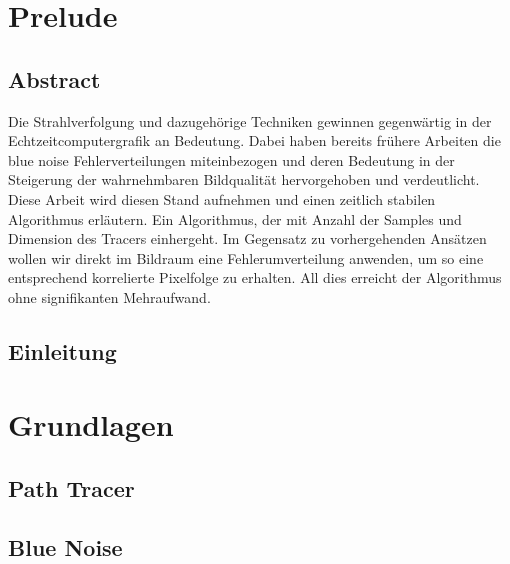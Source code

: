 
\chapter{Prelude}
\label{ch:Introduction}

\section{Abstract}

\vspace*{\fill}
Die Strahlverfolgung und dazugehörige Techniken gewinnen gegenwärtig in der Echtzeitcomputergrafik an Bedeutung. Dabei haben bereits frühere Arbeiten
die blue noise Fehlerverteilungen miteinbezogen und deren Bedeutung in der Steigerung der wahrnehmbaren Bildqualität hervorgehoben und verdeutlicht.
Diese Arbeit wird diesen Stand aufnehmen und einen zeitlich stabilen Algorithmus erläutern. Ein Algorithmus, der mit Anzahl der Samples und Dimension
des Tracers einhergeht. Im Gegensatz zu vorhergehenden Ansätzen wollen wir direkt im Bildraum eine Fehlerumverteilung anwenden, um so eine entsprechend 
korrelierte Pixelfolge zu erhalten. All dies erreicht der Algorithmus ohne signifikanten Mehraufwand.
\vfill

\newpage

\section{Einleitung}

\chapter{Grundlagen}
\label{ch:Grundlagen}


\section{Path Tracer}
\label{ch:Content1:sec:PathTracer}



\newpage
\section{Blue Noise}
\label{ch:Content1:sec:BlueNoise}



